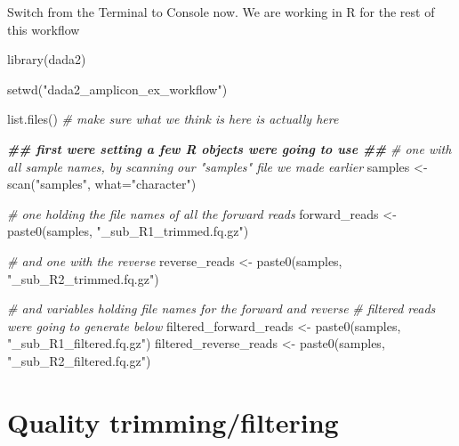 \documentclass[
]{book}
\makeatletter
\newenvironment{Shaded}{\begin{snugshade}}{\end{snugshade}}
\newcommand{\AttributeTok}[1]{\textcolor[rgb]{0.77,0.63,0.00}{#1}}
\newcommand{\CommentTok}[1]{\textcolor[rgb]{0.56,0.35,0.01}{\textit{#1}}}
\newcommand{\DocumentationTok}[1]{\textcolor[rgb]{0.56,0.35,0.01}{\textbf{\textit{#1}}}}
\newcommand{\FunctionTok}[1]{\textcolor[rgb]{0.00,0.00,0.00}{#1}}
\newcommand{\NormalTok}[1]{#1}
\newcommand{\OtherTok}[1]{\textcolor[rgb]{0.56,0.35,0.01}{#1}}
\newcommand{\StringTok}[1]{\textcolor[rgb]{0.31,0.60,0.02}{#1}}
\newenvironment{kframe}{%
\medskip{}
\setlength{\fboxsep}{.8em}
 \def\at@end@of@kframe{}%
 \ifinner\ifhmode%
  \def\at@end@of@kframe{\end{minipage}}%
  \begin{minipage}{\columnwidth}%
 \fi\fi%
 \def\FrameCommand##1{\hskip\@totalleftmargin \hskip-\fboxsep
 \colorbox{shadecolor}{##1}\hskip-\fboxsep
     \hskip-\linewidth \hskip-\@totalleftmargin \hskip\columnwidth}%
 \MakeFramed {\advance\hsize-\width
   \@totalleftmargin\z@ \linewidth\hsize
   \@setminipage}}%
 {\par\unskip\endMakeFramed%
 \at@end@of@kframe}
\newenvironment{block}[1]
  {
  \begin{itemize}
  \renewcommand{\labelitemi}{
    \raisebox{-.7\height}[0pt][0pt]{
      {\setkeys{Gin}{width=3em,keepaspectratio}\texttt{[image: images/\#1]}}
    }
  }
  \setlength{\fboxsep}{1em}
  \begin{kframe}
  \item
  }
  {
  \end{kframe}
  \end{itemize}
  }
\newenvironment{rmdwarning}
  {\begin{block}{warning}}
  {\end{block}}
\makeatother
\begin{document}
\begin{rmdwarning}
Switch from the Terminal to Console now. We are working in R for the
rest of this workflow
\end{rmdwarning}

\begin{Shaded}
\begin{Highlighting}[]
    \FunctionTok{library}\NormalTok{(dada2)}

    \FunctionTok{setwd}\NormalTok{(}\StringTok{"dada2\_amplicon\_ex\_workflow"}\NormalTok{)}

    \FunctionTok{list.files}\NormalTok{() }\CommentTok{\# make sure what we think is here is actually here}

    \DocumentationTok{\#\# first we\textquotesingle{}re setting a few R objects we\textquotesingle{}re going to use \#\#}
      \CommentTok{\# one with all sample names, by scanning our "samples" file we made earlier}
\NormalTok{  samples }\OtherTok{\textless{}{-}} \FunctionTok{scan}\NormalTok{(}\StringTok{"samples"}\NormalTok{, }\AttributeTok{what=}\StringTok{"character"}\NormalTok{)}

      \CommentTok{\# one holding the file names of all the forward reads}
\NormalTok{  forward\_reads }\OtherTok{\textless{}{-}} \FunctionTok{paste0}\NormalTok{(samples, }\StringTok{"\_sub\_R1\_trimmed.fq.gz"}\NormalTok{)}

      \CommentTok{\# and one with the reverse}
\NormalTok{  reverse\_reads }\OtherTok{\textless{}{-}} \FunctionTok{paste0}\NormalTok{(samples, }\StringTok{"\_sub\_R2\_trimmed.fq.gz"}\NormalTok{)}

      \CommentTok{\# and variables holding file names for the forward and reverse}
      \CommentTok{\# filtered reads we\textquotesingle{}re going to generate below}
\NormalTok{  filtered\_forward\_reads }\OtherTok{\textless{}{-}} \FunctionTok{paste0}\NormalTok{(samples, }\StringTok{"\_sub\_R1\_filtered.fq.gz"}\NormalTok{)}
\NormalTok{  filtered\_reverse\_reads }\OtherTok{\textless{}{-}} \FunctionTok{paste0}\NormalTok{(samples, }\StringTok{"\_sub\_R2\_filtered.fq.gz"}\NormalTok{)}
\end{Highlighting}
\end{Shaded}

\hypertarget{quality-trimmingfiltering}{%
\section{Quality trimming/filtering}\label{quality-trimmingfiltering}}
\end{document}
